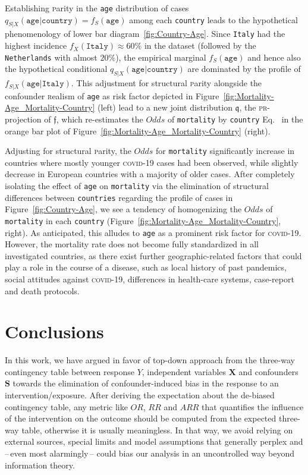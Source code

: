 \documentclass[10pt]{article}
\renewcommand{\eqref}{Eq.~\originaleqref}
\newcommand{\prob}[1]{\mathfrak{#1}}
\begin{document}
%
Establishing \textsc{p}arity in the \texttt{age} distribution of cases $q_{S\vert X}(\texttt{age}\vert \texttt{country})=f_S(\texttt{age})$ among each \texttt{country} leads to the hypothetical phenomenology of lower bar diagram~\ref{fig:Country-Age}. Since \texttt{Italy} had the highest incidence $ f_{X}(\texttt{Italy})\approx60\%$ in the dataset (followed by the \texttt{Netherlands} with almost $20\%$), the empirical marginal $ f_S(\texttt{age})$ and hence also the hypothetical  conditional $ q_{S\vert X}(\texttt{age}\vert \texttt{country})$ are dominated by the profile of $ f_{S\vert X}(\texttt{age}\vert \texttt{Italy})$.
%
This adjustment for structural \textsc{p}arity  alongside the confounder \textsc{r}ealism of \texttt{age} as risk factor depicted in Figure~\ref{fig:Mortality-Age_Mortality-Country} (left) lead to a new joint distribution $\prob q$, the \textsc{pr}-projection of $\prob f$, which re-estimates the  $Odds$ of \texttt{mortality} by \texttt{country} \eqref{eq:COVID19:OddsMortality} in the orange bar plot of Figure~\ref{fig:Mortality-Age_Mortality-Country} (right).

Adjusting for structural \textsc{p}arity, the $Odds$ for \texttt{mortality} significantly increase in countries where mostly younger \textsc{covid}-19 cases had been observed, while slightly decrease in European countries with a majority of older cases. 
After completely isolating the effect of \texttt{age} on \texttt{mortality} via the elimination of structural differences between \texttt{countries} regarding the profile of cases in Figure~\ref{fig:Country-Age}, we see a tendency of homogenizing the $Odds$ of \texttt{mortality} in each \texttt{country} (Figure~\ref{fig:Mortality-Age_Mortality-Country}, right). %
As anticipated, this alludes to \texttt{age} as a prominent risk factor for \textsc{covid}-19. 
However, the {mortality} rate does not become fully standardized in all investigated countries, as there exist further geographic-related factors  that could play a role in the course of a disease, such as local history of past pandemics, social attitudes against \textsc{covid}-19, differences in health-care systems, case-report and death protocols. 


\section{Conclusions}

In this work, we have argued in favor of top-down approach from the three-way contingency table between response $Y$, independent variables $\boldsymbol X$ and confounders $\boldsymbol S$ towards the elimination of confounder-induced bias in the response to an intervention/exposure. 
After deriving the expectation about the de-biased contingency table, any metric like $OR$, $RR$ and $ARR$ that quantifies the influence of the intervention on the outcome
should be computed from the expected three-way table, otherwise it is usually meaningless. In that way, we avoid relying on external sources, special limits and model assumptions that generally perplex and --\,even most alarmingly\,-- could bias our analysis in an uncontrolled way beyond information theory.
\end{document}
